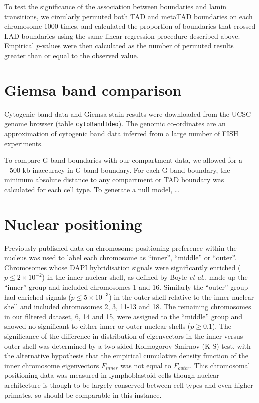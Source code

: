 \documentclass[a4paper,11pt,oneside]{book}
\begin{document}
To test the significance of the association between boundaries and lamin transitions, we circularly permuted both TAD and metaTAD boundaries on each chromosome 1000 times, and calculated the proportion of boundaries that crossed LAD boundaries using the same linear regression procedure described above. Empirical $p$-values were then calculated as the number of permuted results greater than or equal to the observed value.

\section{Giemsa band comparison}\label{giemsa-band-comparison}

Cytogenic band data and Giemsa stain results were downloaded from the
UCSC genome browser (table \texttt{cytoBandIdeo}). The genomic
co-ordinates are an approximation of cytogenic band data inferred from a
large number of FISH experiments.\citep{Furey2003}

To compare G-band boundaries with our compartment data, we allowed for a
$\pm 500$ kb inaccuracy in G-band boundary. For each G-band boundary,
the minimum absolute distance to any compartment or TAD boundary was
calculated for each cell type. To generate a null model, \ldots

\section{Nuclear positioning}\label{methods:positioning}
Previously published data  on chromosome positioning preference within
the nucleus was used to label each chromosome as ``inner'', ``middle''
or ``outer''.\cite{Boyle2001} Chromosomes whose DAPI hybridisation
signals were significantly enriched ($p\leq 2\times10^{-2}$) in the inner nuclear shell, as
defined by Boyle \emph{et al.}\cite{Boyle2001}, made up the ``inner''
group and included chromosomes 1 and 16. Similarly the ``outer'' group
had enriched signals ($p\leq 5\times10^{-3}$) in the outer shell relative to the inner nuclear
shell and included chromosomes 2, 3, 11-13 and 18. The remaining
chromosomes in our filtered dataset, 6, 14 and 15, were assigned to
the ``middle'' group and showed no significant to either inner or
outer nuclear shells ($p \geq 0.1$).\cite{Boyle2001} The significance
of the difference in distribution of eigenvectors in the inner
versus outer shell was determined by a two-sided Kolmogorov-Smirnov (K-S)
test, with the alternative hypothesis that the empirical cumulative
density function of the inner chromosome eigenvectors $F_{inner}$ was not equal to $F_{outer}$. This chromosomal positioning data was measured in lymphoblastoid
cells though nuclear architecture is though to be largely conserved
between cell types\cite{Chambers2013, DeWit2013} and even higher primates,\cite{Tanabe2002} so should be comparable in this instance.
\end{document}
